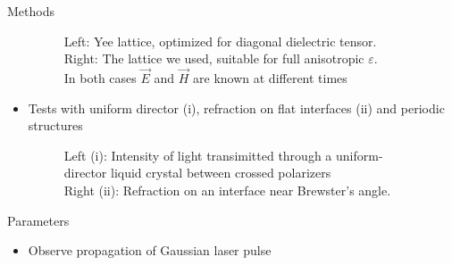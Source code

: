 \documentclass[8pt]{beamer}
\newlength{\wideitemsep}
\let\olditem\item
\renewcommand{\item}{\setlength{\itemsep}{\wideitemsep}\olditem}
\newcommand{\blockpadding}{
  \rule[-0.6ex]{0pt}{2.5ex}
}
\begin{document}
\begin{columns}[t]
\begin{column}{.36\textwidth}
\begin{block}{\blockpadding Methods}
\begin{itemize}
\begin{figure}[h]
{}
\label{fig:lattice}
\caption{{\color{dark} Left:} Yee lattice, optimized for diagonal dielectric tensor. \\{\color{dark} Right:} The lattice we used, suitable for full anisotropic $\varepsilon$. \\In both cases $\vec E$ and $\vec H$ are known at different times}
\end{figure}
  \item Tests with uniform director (i), refraction on flat interfaces (ii) and periodic structures
  \vspace{-2ex}
  \begin{figure}[h]
   \centering
   \subfigure{\scalebox{0.7}{}}
   \subfigure{\scalebox{0.77}{}}
   \caption{{\color{dark} Left (i):} Intensity of light transimitted through a uniform-director liquid crystal between crossed polarizers\\
   {\color{dark} Right (ii):} Refraction on an interface near Brewster's angle.}
  \end{figure}
  \vspace{-2ex}
    \end{itemize}
  \end{block}
  
  \begin{block}{\blockpadding Parameters}
  \begin{itemize}
  \item Observe propagation of Gaussian laser pulse


\end{itemize}
\end{block}
\end{column}
\end{columns}
\end{document}

